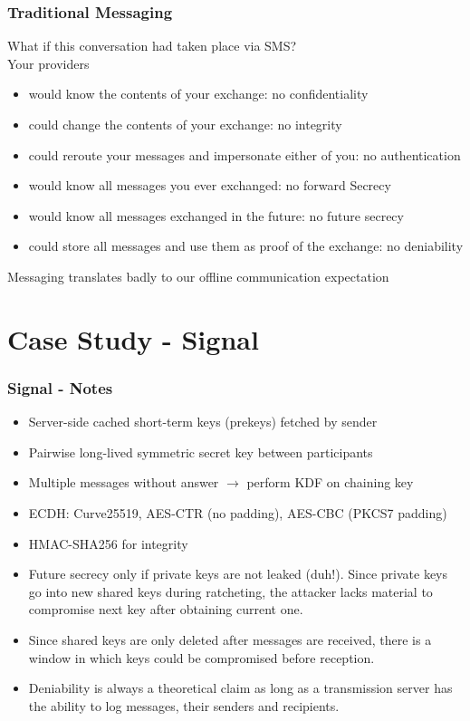 \documentclass[aspectratio=169]{beamer}
\begin{document}
\begin{frame}
	\frametitle{Traditional Messaging}
	What if this conversation had taken place via SMS?\\[1em]
	Your providers
	\begin{itemize}
		\item would know the contents of your exchange: \alert{no confidentiality}
		\item could change the contents of your exchange: \alert{no integrity}
		\item could reroute your messages and impersonate either of you: \alert{no authentication}
		\item would know all messages you ever exchanged: \alert{no forward Secrecy}
		\item would know all messages exchanged in the future: \alert{no future secrecy}
		\item could store all messages and use them as proof of the exchange: \alert{no deniability}
	\end{itemize}
	Messaging translates badly to our offline communication expectation
\end{frame}

\section{Case Study - Signal}

\begin{frame}
	\frametitle{Signal - Notes}
	\begin{itemize}
		\item Server-side cached short-term keys (\alert{prekeys}) fetched by sender
		\item Pairwise long-lived symmetric secret key between participants
		\item Multiple messages without answer $\rightarrow$ perform KDF on \alert{chaining key}
		\item ECDH: Curve25519, AES-CTR (no padding), AES-CBC (PKCS7 padding)
		\item HMAC-SHA256 for integrity
		\item Future secrecy only if private keys are not leaked (duh!). Since private keys go into new shared keys during ratcheting, the attacker lacks material to compromise next key after obtaining current one.
		\item Since shared keys are only deleted after messages are received, there is a window in which keys could be compromised before reception. 
		\item Deniability is always a theoretical claim as long as a transmission server has the ability to log messages, their senders and recipients.

	\end{itemize}
\end{frame}
\end{document}
